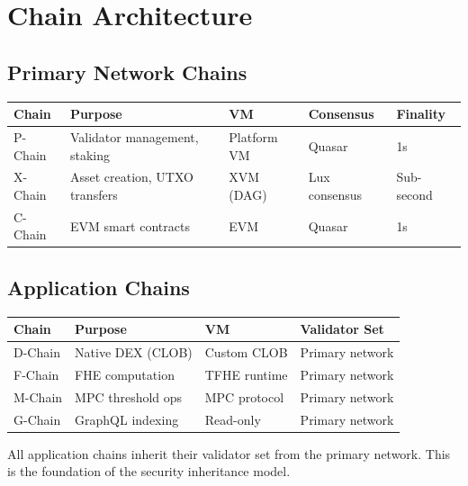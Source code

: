 \section{Chain Architecture}


\subsection{Primary Network Chains}

\begin{center}
\begin{tabular}{lllll}
\toprule
\textbf{Chain} & \textbf{Purpose} & \textbf{VM} & \textbf{Consensus} & \textbf{Finality} \\
\midrule
P-Chain & Validator management, staking & Platform VM & Quasar & 1s \\
X-Chain & Asset creation, UTXO transfers & XVM (DAG) & Lux consensus & Sub-second \\
C-Chain & EVM smart contracts & EVM & Quasar & 1s \\
\bottomrule
\end{tabular}
\end{center}

\subsection{Application Chains}

\begin{center}
\begin{tabular}{llll}
\toprule
\textbf{Chain} & \textbf{Purpose} & \textbf{VM} & \textbf{Validator Set} \\
\midrule
D-Chain & Native DEX (CLOB) & Custom CLOB & Primary network \\
F-Chain & FHE computation & TFHE runtime & Primary network \\
M-Chain & MPC threshold ops & MPC protocol & Primary network \\
G-Chain & GraphQL indexing & Read-only & Primary network \\
\bottomrule
\end{tabular}
\end{center}

All application chains inherit their validator set from the primary network. This is the foundation of the security inheritance model.

